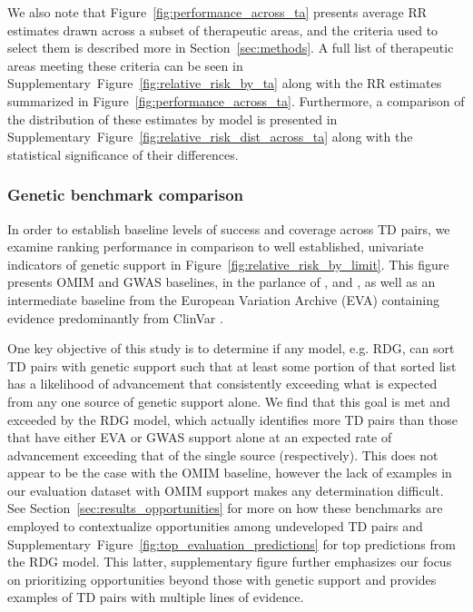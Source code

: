 \documentclass{article}
\begin{document}
We also note that Figure~\ref{fig:performance_across_ta} presents average RR estimates drawn across a subset of therapeutic areas, and the criteria used to select them is described more in Section~\ref{sec:methods}. A full list of therapeutic areas meeting these criteria can be seen in Supplementary~Figure~\ref{fig:relative_risk_by_ta} along with the RR estimates summarized in Figure~\ref{fig:performance_across_ta}. Furthermore, a comparison of the distribution of these estimates by model is presented in Supplementary~Figure~\ref{fig:relative_risk_dist_across_ta} along with the statistical significance of their differences.

\subsubsection{Genetic benchmark comparison}

In order to establish baseline levels of success and coverage across TD pairs, we examine ranking performance in comparison to well established, univariate indicators of genetic support in Figure~\ref{fig:relative_risk_by_limit}. This figure presents OMIM and GWAS baselines, in the parlance of \cite{King2019-rc}, \cite{Nelson2015-eg} and \cite{Minikel2023.06.23.23291765}, as well as an intermediate baseline from the European Variation Archive (EVA) \cite{PMID:34718739} containing evidence predominantly from ClinVar \cite{PMID:24234437}.

One key objective of this study is to determine if any model, e.g. RDG, can sort TD pairs with genetic support such that at least some portion of that sorted list has a likelihood of advancement that consistently exceeding what is expected from any one source of genetic support alone. We find that this goal is met and exceeded by the RDG model, which actually identifies more TD pairs than those that have either EVA or GWAS support alone at an expected rate of advancement exceeding that of the single source (respectively). This does not appear to be the case with the OMIM baseline, however the lack of examples in our evaluation dataset with OMIM support makes any determination difficult. See Section~\ref{sec:results_opportunities} for more on how these benchmarks are employed to contextualize opportunities among undeveloped TD pairs and Supplementary~Figure~\ref{fig:top_evaluation_predictions} for top predictions from the RDG model. This latter, supplementary figure further emphasizes our focus on prioritizing opportunities beyond those with genetic support and provides examples of TD pairs with multiple lines of evidence.
\end{document}
